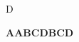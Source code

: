 \documentclass[timestamp]{jazzgrid}
\begin{document}
\begin{musicsection}{D}
\barline
	{\barfour{}
		{}
		{}
		{}
		{}
	}
	{\barfour{}
		{}
		{}
		{}
		{}
	}
	{\barfour{}
		{}
		{}
		{}
		{}
	}
	{\barfour{}
		{}
		{}
		{}
		{}
	}
\barline
	{\barfour{}
		{}
		{}
		{}
		{}
	}
	{\barfour{}
		{}
		{}
		{}
		{}
	}
	{\barfour{}
		{}
		{}
		{}
		{}
	}
	{\barfour{}
		{}
		{}
		{}
		{}
	}
\barline
	{\barfour{}
		{}
		{}
		{}
		{}
	}
	{\barfour{}
		{}
		{}
		{}
		{}
	}
	{\barfour{}
		{}
		{}
		{}
		{}
	}
	{\barfour{}
		{}
		{}
		{}
		{}
	}
\barline
	{\barfour{}
		{}
		{}
		{}
		{}
	}
	{\barfour{}
		{}
		{}
		{}
		{}
	}
	{\barfour{}
		{}
		{}
		{}
		{}
	}
	{\barfour{}
		{}
		{}
		{}
		{}
	}
\end{musicsection}
\scriptsize
\textbf{AABCDBCD}
\end{document}

